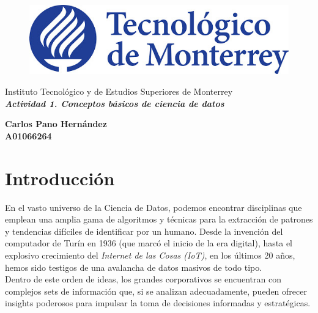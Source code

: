 \documentclass[12pt]{article}
\begin{document}
\thispagestyle{empty}
\begin{center}
\begin{figure}[h]
\centering
\includegraphics[width=.6\textwidth]{logo.jpg}\\
\end{figure}

\vspace{1cm}
\Large \sc  Instituto Tecnológico y de Estudios Superiores de Monterrey
\\

\vspace{2.5cm}
\Large \bf
\emph{Actividad 1. Conceptos básicos de ciencia de datos}

\vspace{2.5cm}
\Large \bf Carlos Pano Hernández\\
\vspace{0.3cm}
\Large \bf A01066264\\
\vspace{3.5cm}
\normalsize \sc {}
\vspace{0.3cm}
\normalsize \sc {}
\end{center}

\newpage

\section{Introducción}
En el vasto universo de la Ciencia de Datos, podemos encontrar disciplinas que emplean una amplia gama de algoritmos y técnicas para la extracción de patrones y tendencias difíciles de identificar por un humano. Desde la invención del computador de Turín en 1936 (que marcó el inicio de la era digital), hasta el explosivo crecimiento del \emph{Internet de las Cosas (IoT)}, en los últimos 20 años, hemos sido testigos de una avalancha de datos masivos de todo tipo.\\

Dentro de este orden de ideas, los grandes corporativos se encuentran con complejos sets de información que, si se analizan adecuadamente, pueden ofrecer insights poderosos para impulsar la toma de decisiones informadas y estratégicas.\\
\end{document}
